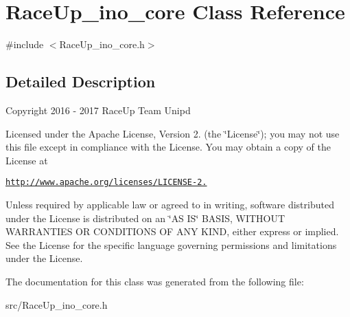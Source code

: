 \hypertarget{class_race_up__ino__core}{}\section{Race\+Up\+\_\+ino\+\_\+core Class Reference}
\label{class_race_up__ino__core}


{\ttfamily \#include $<$Race\+Up\+\_\+ino\+\_\+core.\+h$>$}



\subsection{Detailed Description}
Copyright 2016 -\/ 2017 Race\+Up Team Unipd

Licensed under the Apache License, Version 2. (the \char`\"{}\+License\char`\"{}); you may not use this file except in compliance with the License. You may obtain a copy of the License at

\href{http://www.apache.org/licenses/LICENSE-2.0}{\tt http\+://www.\+apache.\+org/licenses/\+L\+I\+C\+E\+N\+S\+E-\/2.}

Unless required by applicable law or agreed to in writing, software distributed under the License is distributed on an \char`\"{}\+A\+S I\+S\char`\"{} B\+A\+S\+IS, W\+I\+T\+H\+O\+UT W\+A\+R\+R\+A\+N\+T\+I\+ES OR C\+O\+N\+D\+I\+T\+I\+O\+NS OF A\+NY K\+I\+ND, either express or implied. See the License for the specific language governing permissions and limitations under the License. 

The documentation for this class was generated from the following file\+:\begin{DoxyCompactItemize}
\item 
src/Race\+Up\+\_\+ino\+\_\+core.\+h\end{DoxyCompactItemize}
